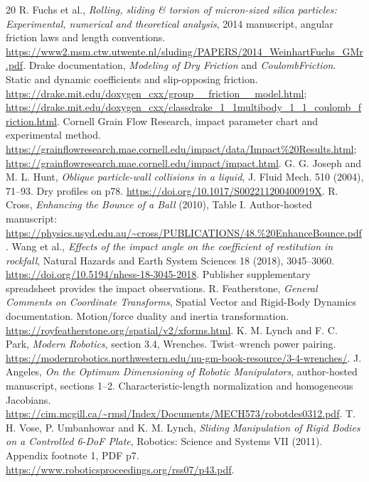 \documentclass[11pt,a4paper]{article}
\begin{document}
\begingroup
\raggedright
\begin{thebibliography}{20}
 R. Fuchs et al., \emph{Rolling, sliding \& torsion of micron-sized silica particles: Experimental, numerical and theoretical analysis}, 2014 manuscript, angular friction laws and length conventions. \url{https://www2.msm.ctw.utwente.nl/sluding/PAPERS/2014_WeinhartFuchs_GMr.pdf}.
 Drake documentation, \emph{Modeling of Dry Friction} and \emph{CoulombFriction}. Static and dynamic coefficients and slip-opposing friction. \url{https://drake.mit.edu/doxygen_cxx/group__friction__model.html}; \url{https://drake.mit.edu/doxygen_cxx/classdrake_1_1multibody_1_1_coulomb_friction.html}.
 Cornell Grain Flow Research, impact parameter chart and experimental method. \url{https://grainflowresearch.mae.cornell.edu/impact/data/Impact%20Results.html}; \url{https://grainflowresearch.mae.cornell.edu/impact/impact.html}.
 G. G. Joseph and M. L. Hunt, \emph{Oblique particle-wall collisions in a liquid}, J. Fluid Mech. 510 (2004), 71--93. Dry profiles on p78. \url{https://doi.org/10.1017/S002211200400919X}.
 R. Cross, \emph{Enhancing the Bounce of a Ball} (2010), Table I. Author-hosted manuscript: \url{https://physics.usyd.edu.au/~cross/PUBLICATIONS/48.%20EnhanceBounce.pdf}.
 Wang et al., \emph{Effects of the impact angle on the coefficient of restitution in rockfall}, Natural Hazards and Earth System Sciences 18 (2018), 3045--3060. \url{https://doi.org/10.5194/nhess-18-3045-2018}. Publisher supplementary spreadsheet provides the impact observations.
 R. Featherstone, \emph{General Comments on Coordinate Transforms}, Spatial Vector and Rigid-Body Dynamics documentation. Motion/force duality and inertia transformation. \url{https://royfeatherstone.org/spatial/v2/xforms.html}.
 K. M. Lynch and F. C. Park, \emph{Modern Robotics}, section 3.4, Wrenches. Twist--wrench power pairing. \url{https://modernrobotics.northwestern.edu/nu-gm-book-resource/3-4-wrenches/}.
 J. Angeles, \emph{On the Optimum Dimensioning of Robotic Manipulators}, author-hosted manuscript, sections 1--2. Characteristic-length normalization and homogeneous Jacobians. \url{https://cim.mcgill.ca/~rmsl/Index/Documents/MECH573/robotdes0312.pdf}.
 T. H. Vose, P. Umbanhowar and K. M. Lynch, \emph{Sliding Manipulation of Rigid Bodies on a Controlled 6-DoF Plate}, Robotics: Science and Systems VII (2011). Appendix footnote 1, PDF p7. \url{https://www.roboticsproceedings.org/rss07/p43.pdf}.

\end{thebibliography}
\end{document}
